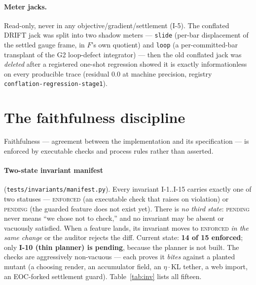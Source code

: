 \documentclass[11pt]{article}
\newcommand{\code}[1]{\texttt{\small #1}}
\begin{document}
\paragraph{Meter jacks.} Read-only, never in any objective/gradient/settlement
(I-5). The conflated DRIFT jack was split into two shadow meters --- \code{slide}
(per-bar displacement of the settled gauge frame, in $F$'s own quotient) and
\code{loop} (a per-committed-bar transplant of the G2 loop-defect integrator) ---
then the old conflated jack was \emph{deleted} after a registered one-shot
regression showed it is exactly informationless on every producible trace (residual
$0.0$ at machine precision, registry \code{conflation-regression-stage1}).

\section{The faithfulness discipline}

Faithfulness --- agreement between the implementation and its specification --- is
enforced by executable checks and process rules rather than asserted.

\paragraph{Two-state invariant manifest} (\code{tests/invariants/manifest.py}).
Every invariant I-1..I-15 carries exactly one of two statuses --- \textsc{enforced}
(an executable check that raises on violation) or \textsc{pending} (the guarded
feature does not exist yet). There is \emph{no third state}: \textsc{pending} never
means ``we chose not to check,'' and no invariant may be absent or vacuously
satisfied. When a feature lands, its invariant moves to \textsc{enforced} \emph{in
the same change} or the auditor rejects the diff. Current state: \textbf{14 of 15
enforced}; only \textbf{I-10 (thin planner) is pending}, because the planner is not
built. The checks are aggressively non-vacuous --- each proves it \emph{bites}
against a planted mutant (a choosing render, an accumulator field, an
$\eta{\cdot}$KL tether, a web import, an EOC-forked settlement guard).
Table~\ref{tab:inv} lists all fifteen.
\end{document}
